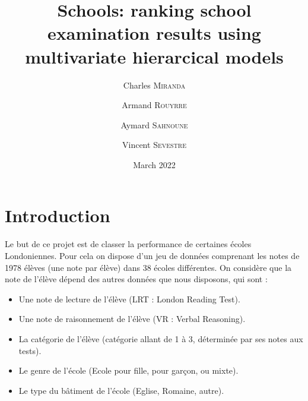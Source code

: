 \documentclass[11pt]{article}
\title{Schools: ranking school examination results using multivariate hierarcical models}
\author[1]{Charles \textsc{Miranda}}
\author[2]{Armand \textsc{Rouyrre}}
\author[3]{Aymard \textsc{Sahnoune}}
\author[4]{Vincent \textsc{Sevestre}}
\date{March 2022}
\begin{document}
    \maketitle

 \section{Introduction}
    Le but de ce projet est de classer la performance de certaines écoles Londoniennes. Pour cela on dispose d'un jeu de données comprenant les notes de 1978 élèves (une note par élève) dans 38 écoles différentes. On considère que la note de l'élève dépend des autres données que nous disposons, qui sont : 
    \begin{itemize}
        \item Une note de lecture de l'élève (LRT : London Reading Test).
        \item Une note de raisonnement de l'élève (VR : Verbal Reasoning).
        \item La catégorie de l'élève (catégorie allant de 1 à 3, déterminée par ses notes aux tests).
        \item Le genre de l'école (Ecole pour fille, pour garçon, ou mixte).
        \item Le type du bâtiment de l'école (Eglise, Romaine, autre).
        
        

        
    \end{itemize}

    
\end{document}

